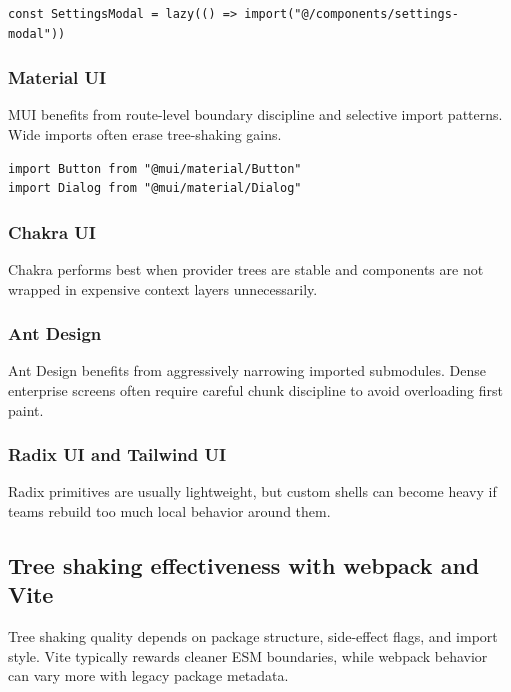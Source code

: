 \begin{verbatim}
const SettingsModal = lazy(() => import("@/components/settings-modal"))
\end{verbatim}

\subsubsection{Material UI}
MUI benefits from route-level boundary discipline and selective import patterns. Wide imports often erase tree-shaking gains.

\begin{verbatim}
import Button from "@mui/material/Button"
import Dialog from "@mui/material/Dialog"
\end{verbatim}

\subsubsection{Chakra UI}
Chakra performs best when provider trees are stable and components are not wrapped in expensive context layers unnecessarily.

\subsubsection{Ant Design}
Ant Design benefits from aggressively narrowing imported submodules. Dense enterprise screens often require careful chunk discipline to avoid overloading first paint.

\subsubsection{Radix UI and Tailwind UI}
Radix primitives are usually lightweight, but custom shells can become heavy if teams rebuild too much local behavior around them.

\subsection{Tree shaking effectiveness with webpack and Vite}
Tree shaking quality depends on package structure, side-effect flags, and import style. Vite typically rewards cleaner ESM boundaries, while webpack behavior can vary more with legacy package metadata.

